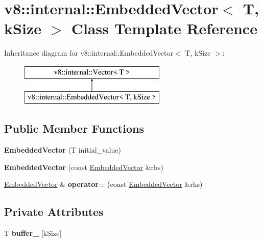 \hypertarget{classv8_1_1internal_1_1_embedded_vector}{}\section{v8\+:\+:internal\+:\+:Embedded\+Vector$<$ T, k\+Size $>$ Class Template Reference}
\label{classv8_1_1internal_1_1_embedded_vector}
Inheritance diagram for v8\+:\+:internal\+:\+:Embedded\+Vector$<$ T, k\+Size $>$\+:\begin{figure}[H]
\begin{center}
\leavevmode
\includegraphics[height=2.000000cm]{classv8_1_1internal_1_1_embedded_vector}
\end{center}
\end{figure}
\subsection*{Public Member Functions}
\begin{DoxyCompactItemize}
\item 
{\bfseries Embedded\+Vector} (T initial\+\_\+value)\hypertarget{classv8_1_1internal_1_1_embedded_vector_a083ff24cfe7d3a2d079045eb8818fbdd}{}\label{classv8_1_1internal_1_1_embedded_vector_a083ff24cfe7d3a2d079045eb8818fbdd}

\item 
{\bfseries Embedded\+Vector} (const \hyperlink{classv8_1_1internal_1_1_embedded_vector}{Embedded\+Vector} \&rhs)\hypertarget{classv8_1_1internal_1_1_embedded_vector_a4060b1a3ad19ff94e059bc0e7916fc05}{}\label{classv8_1_1internal_1_1_embedded_vector_a4060b1a3ad19ff94e059bc0e7916fc05}

\item 
\hyperlink{classv8_1_1internal_1_1_embedded_vector}{Embedded\+Vector} \& {\bfseries operator=} (const \hyperlink{classv8_1_1internal_1_1_embedded_vector}{Embedded\+Vector} \&rhs)\hypertarget{classv8_1_1internal_1_1_embedded_vector_a5f6d10806a8caa0f6876ee09ca23f0e7}{}\label{classv8_1_1internal_1_1_embedded_vector_a5f6d10806a8caa0f6876ee09ca23f0e7}

\end{DoxyCompactItemize}
\subsection*{Private Attributes}
\begin{DoxyCompactItemize}
\item 
T {\bfseries buffer\+\_\+} \mbox{[}k\+Size\mbox{]}\hypertarget{classv8_1_1internal_1_1_embedded_vector_a92bdeae3089a121761d4bf74173f3213}{}\label{classv8_1_1internal_1_1_embedded_vector_a92bdeae3089a121761d4bf74173f3213}

\end{DoxyCompactItemize}
